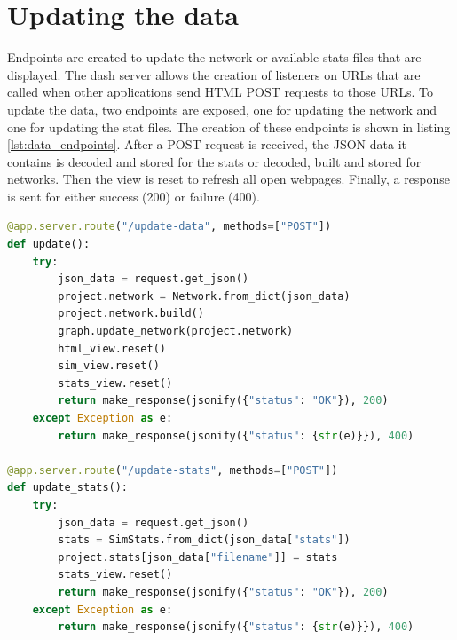 \section{Updating the data}
Endpoints are created to update the network or available stats files that are displayed. The dash server allows the creation of listeners on URLs that are called when other applications send HTML POST requests to those URLs. To update the data, two endpoints are exposed, one for updating the network and one for updating the stat files. The creation of these endpoints is shown in listing \ref{lst:data_endpoints}. After a POST request is received, the JSON data it contains is decoded and stored for the stats or decoded, built and stored for networks. Then the view is reset to refresh all open webpages. Finally, a response is sent for either success (200) or failure (400).

\begin{lstlisting}[language=python, caption={Endpoints for updating data}, label={lst:data_endpoints}]
@app.server.route("/update-data", methods=["POST"])
def update():
    try:
        json_data = request.get_json()
        project.network = Network.from_dict(json_data)
        project.network.build()
        graph.update_network(project.network)
        html_view.reset()
        sim_view.reset()
        stats_view.reset()
        return make_response(jsonify({"status": "OK"}), 200)
    except Exception as e:
        return make_response(jsonify({"status": {str(e)}}), 400)

@app.server.route("/update-stats", methods=["POST"])
def update_stats():
    try:
        json_data = request.get_json()
        stats = SimStats.from_dict(json_data["stats"])
        project.stats[json_data["filename"]] = stats
        stats_view.reset()
        return make_response(jsonify({"status": "OK"}), 200)
    except Exception as e:
        return make_response(jsonify({"status": {str(e)}}), 400)
\end{lstlisting}

